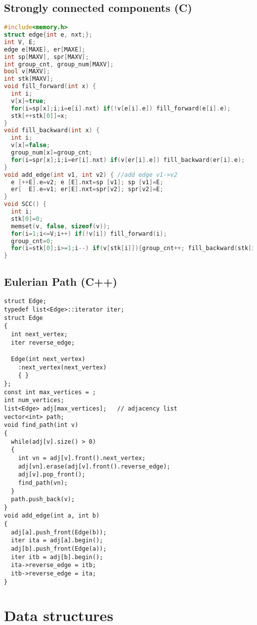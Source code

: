 \subsection{Strongly connected components (C)}
\begin{lstlisting}[language=C++]
#include<memory.h>
struct edge{int e, nxt;};
int V, E;
edge e[MAXE], er[MAXE];
int sp[MAXV], spr[MAXV];
int group_cnt, group_num[MAXV];
bool v[MAXV];
int stk[MAXV];
void fill_forward(int x) {
  int i;
  v[x]=true;
  for(i=sp[x];i;i=e[i].nxt) if(!v[e[i].e]) fill_forward(e[i].e);
  stk[++stk[0]]=x;
}
void fill_backward(int x) {
  int i;
  v[x]=false;
  group_num[x]=group_cnt;
  for(i=spr[x];i;i=er[i].nxt) if(v[er[i].e]) fill_backward(er[i].e);
}
void add_edge(int v1, int v2) { //add edge v1->v2
  e [++E].e=v2; e [E].nxt=sp [v1]; sp [v1]=E;
  er[  E].e=v1; er[E].nxt=spr[v2]; spr[v2]=E;
}
void SCC() {
  int i;
  stk[0]=0;
  memset(v, false, sizeof(v));
  for(i=1;i<=V;i++) if(!v[i]) fill_forward(i);
  group_cnt=0;
  for(i=stk[0];i>=1;i--) if(v[stk[i]]){group_cnt++; fill_backward(stk[i]);}
}
\end{lstlisting}
\subsection{Eulerian Path (C++)}
\begin{lstlisting}
struct Edge;
typedef list<Edge>::iterator iter;
struct Edge
{
  int next_vertex;
  iter reverse_edge;

  Edge(int next_vertex)
    :next_vertex(next_vertex)
    { }
};
const int max_vertices = ;
int num_vertices;
list<Edge> adj[max_vertices];   // adjacency list
vector<int> path;
void find_path(int v)
{
  while(adj[v].size() > 0)
  {
    int vn = adj[v].front().next_vertex;
    adj[vn].erase(adj[v].front().reverse_edge);
    adj[v].pop_front();
    find_path(vn);
  }
  path.push_back(v);
}
void add_edge(int a, int b)
{
  adj[a].push_front(Edge(b));
  iter ita = adj[a].begin();
  adj[b].push_front(Edge(a));
  iter itb = adj[b].begin();
  ita->reverse_edge = itb;
  itb->reverse_edge = ita;
}
\end{lstlisting}
\section{Data structures}
